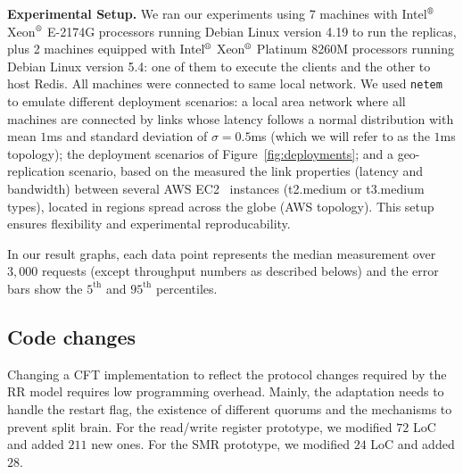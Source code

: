 \noindent \textbf{Experimental Setup.}
We ran our experiments using 7 machines  with
Intel$^\text{\textregistered}$ Xeon$^\text{\textregistered}$ E-2174G
processors running Debian Linux version 4.19 to run the replicas,
plus 2 machines equipped with Intel$^\text{\textregistered}$
Xeon$^\text{\textregistered}$ Platinum 8260M processors running Debian
Linux version 5.4: one of them to execute the clients and the other to
host Redis.
%
All machines were connected to same local network. We used
\texttt{netem}\cite{netem} to emulate different deployment scenarios:
a local area network where all machines are connected by links whose
latency follows a normal distribution with mean $1$ms and standard
deviation of $\sigma = 0.5$ms (which we will refer to as the $1$ms
topology); the deployment scenarios of Figure~\ref{fig:deployments};
and a geo-replication scenario, based on the measured the link
properties (latency and bandwidth) between several AWS EC2~\cite{ec2}
instances (t2.medium or t3.medium types), located in regions spread
across the globe (AWS topology). This setup ensures flexibility and
experimental reproducability.

In our result graphs, each data point represents the median
measurement over $3,000$ requests (except throughput numbers as
described belows) and the error bars show the $5^{\text{th}}$ and
$95^{\text{th}}$ percentiles.

\subsection{Code changes}\label{ssec:implementation_effort}

Changing a \ac{CFT} implementation to reflect the protocol changes
required by the \ac{RR} model requires low programming
overhead. Mainly, the adaptation needs to handle the restart
flag, the existence of different quorums and the mechanisms to
prevent split brain. For the read/write register prototype, we
modified $72$ LoC and added $211$ new ones. For the SMR
prototype, we modified $24$ LoC and added $28$.

